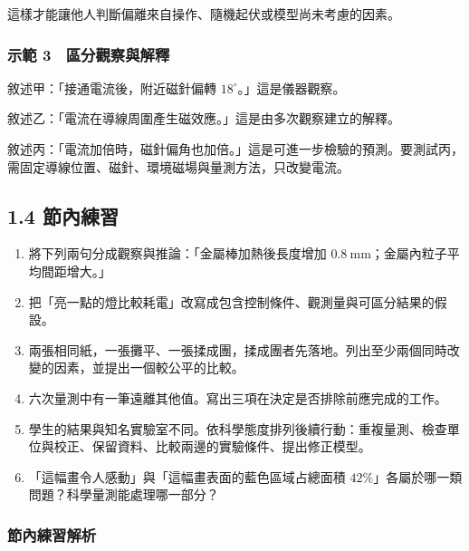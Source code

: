 \documentclass[11pt,a4paper]{article}
\providecommand{\tightlist}{%
  \setlength{\itemsep}{0pt}\setlength{\parskip}{0pt}}
\begin{document}
這樣才能讓他人判斷偏離來自操作、隨機起伏或模型尚未考慮的因素。

\subsubsection{示範 3　區分觀察與解釋}\label{ux793aux7bc4-3-ux5340ux5206ux89c0ux5bdfux8207ux89e3ux91cb}

敘述甲：「接通電流後，附近磁針偏轉 \(18^\circ\)。」這是儀器觀察。

敘述乙：「電流在導線周圍產生磁效應。」這是由多次觀察建立的解釋。

敘述丙：「電流加倍時，磁針偏角也加倍。」這是可進一步檢驗的預測。要測試丙，需固定導線位置、磁針、環境磁場與量測方法，只改變電流。

\subsection{1.4 節內練習}\label{ux7bc0ux5167ux7df4ux7fd2}

\begin{enumerate}
\def\labelenumi{\arabic{enumi}.}
\tightlist
\item
  將下列兩句分成觀察與推論：「金屬棒加熱後長度增加 \(0.8\ \mathrm{mm}\)；金屬內粒子平均間距增大。」
\item
  把「亮一點的燈比較耗電」改寫成包含控制條件、觀測量與可區分結果的假設。
\item
  兩張相同紙，一張攤平、一張揉成團，揉成團者先落地。列出至少兩個同時改變的因素，並提出一個較公平的比較。
\item
  六次量測中有一筆遠離其他值。寫出三項在決定是否排除前應完成的工作。
\item
  學生的結果與知名實驗室不同。依科學態度排列後續行動：重複量測、檢查單位與校正、保留資料、比較兩邊的實驗條件、提出修正模型。
\item
  「這幅畫令人感動」與「這幅畫表面的藍色區域占總面積 \(42\%\)」各屬於哪一類問題？科學量測能處理哪一部分？
\end{enumerate}

\subsubsection{節內練習解析}\label{ux7bc0ux5167ux7df4ux7fd2ux89e3ux6790}
\end{document}
